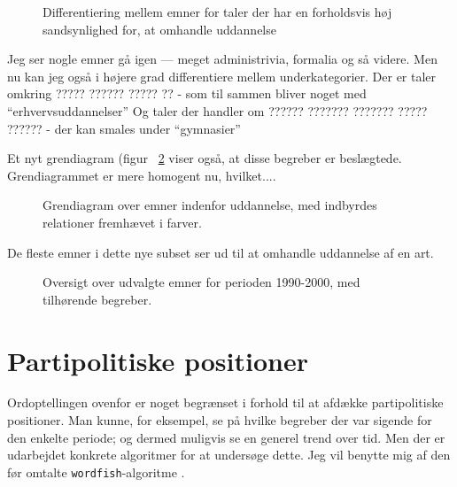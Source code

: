 \begin{figure}
  
\caption{Differentiering mellem emner for taler der har en forholdsvis høj sandsynlighed for, at omhandle uddannelse}
\label{fig:models_edu}
\end{figure}

Jeg ser nogle emner gå igen — meget administrivia, formalia og så videre.
Men nu kan jeg også i højere grad differentiere mellem underkategorier.
Der er taler omkring ????? ?????? ????? ??  - som til sammen bliver noget med “erhvervsuddannelser”
Og taler der handler om ?????? ??????? ??????? ????? ?????? - der kan smales under “gymnasier”

Et nyt grendiagram (figur ~\ref{fig:dendro_edu} viser også, at disse begreber er beslægtede.
Grendiagrammet er mere homogent nu, hvilket....


\begin{figure}
 
\caption{Grendiagram over emner indenfor uddannelse, med indbyrdes relationer fremhævet i farver.}
\label{fig:dendro_edu}
\end{figure}


De fleste emner i dette nye subset ser ud til at omhandle uddannelse af en art.

\begin{figure}
\begin{adjustwidth}{-1in}{-1in}
  
\end{adjustwidth}
\caption{Oversigt over udvalgte emner for perioden 1990-2000, med tilhørende begreber.}
\label{fig:termsEdu}
\end{figure}

\section{Partipolitiske positioner}

Ordoptellingen ovenfor er noget begrænset i forhold til at afdække partipolitiske positioner.
Man kunne, for eksempel, se på hvilke begreber der var sigende for den enkelte periode; og dermed muligvis se en generel trend over tid.
Men der er udarbejdet konkrete algoritmer for at undersøge dette.
Jeg vil benytte mig af den før omtalte \texttt{wordfish}-algoritme \autocite{slapinScalingModelEstimating2008}.

